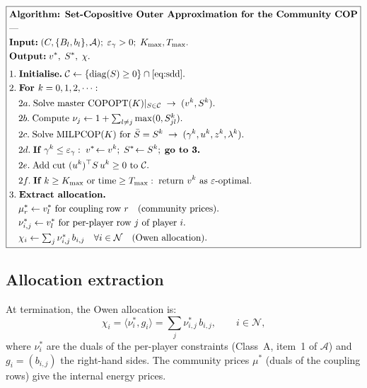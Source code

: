 \documentclass[11pt]{article}
\theoremstyle{definition}
\newcommand{\N}{\mathcal{N}}
\newcommand{\inner}[2]{\langle #1, #2 \rangle}
\newcommand{\diag}{\operatorname{diag}}
\begin{document}
\begin{equation}
\boxed{
\begin{aligned}
&\textbf{Algorithm: Set-Copositive Outer Approximation for the Community COP}\\
&\text{---}\\
&\textbf{Input:}\; (C,\{B_l,b_l\},\mathcal{A});\;
  \varepsilon_{\gamma}>0;\;K_{\max},T_{\max}.\\
&\textbf{Output:}\; v^{*},\;S^{*},\;\chi.\\[4pt]
&1.\;\textbf{Initialise.}\;
  \mathcal{C}\leftarrow\{\diag(S)\ge0\}\cap\eqref{eq:sdd}.\\
&2.\;\textbf{For } k=0,1,2,\dots:\\
&\quad 2a.\;\text{Solve master }
  \mathrm{COPOPT}(K)|_{S\in\mathcal{C}}
  \;\to\;(v^{k},S^{k}).\\
&\quad 2b.\;\text{Compute } \nu_j\leftarrow
  1+\textstyle\sum_{l\neq j}\max(0,S^{k}_{jl}).\\
&\quad 2c.\;\text{Solve }\mathrm{MILPCOP}(K)
  \text{ for }\bar S=S^{k}
  \;\to\;(\gamma^{k},u^{k},z^{k},\lambda^{k}).\\
&\quad 2d.\;\textbf{If } \gamma^{k}\le\varepsilon_{\gamma}:\;
  v^{*}\!\leftarrow v^{k};\;S^{*}\!\leftarrow S^{k};\;
  \textbf{go to 3.}\\
&\quad 2e.\;\text{Add cut }(u^{k})^{\top}S\,u^{k}\ge0
  \text{ to }\mathcal{C}.\\
&\quad 2f.\;\textbf{If } k\ge K_{\max}\text{ or time}\ge T_{\max}:\;
  \text{return }v^{k}\text{ as }\varepsilon\text{-optimal.}\\
&3.\;\textbf{Extract allocation.}\\
&\quad \mu^{*}_r\leftarrow v^{*}_l\text{ for coupling row }r
  \quad\text{(community prices)}.\\
&\quad \nu^{*}_{i,j}\leftarrow v^{*}_l\text{ for per-player row }j
  \text{ of player }i.\\
&\quad \chi_i\leftarrow\textstyle\sum_j\nu^{*}_{i,j}\,b_{i,j}
  \quad\forall i\in\N
  \quad\text{(Owen allocation)}.
\end{aligned}}
\label{eq:algorithm}
\end{equation}

\subsection{Allocation extraction}
\label{sec:allocation}

At termination, the Owen allocation is:
\begin{equation}
\chi_i=\inner{\nu_i^{*}}{g_i}=
\textstyle\sum_j\nu^{*}_{i,j}\,b_{i,j},
\qquad i\in\N,
\label{eq:allocation-extract}
\end{equation}
where $\nu_i^{*}$ are the duals of the per-player constraints
(Class~A, item~1 of $\mathcal{A}$) and $g_i=(b_{i,j})$ the
right-hand sides.  The community prices $\mu^{*}$ (duals of the
coupling rows) give the internal energy prices.
\end{document}
